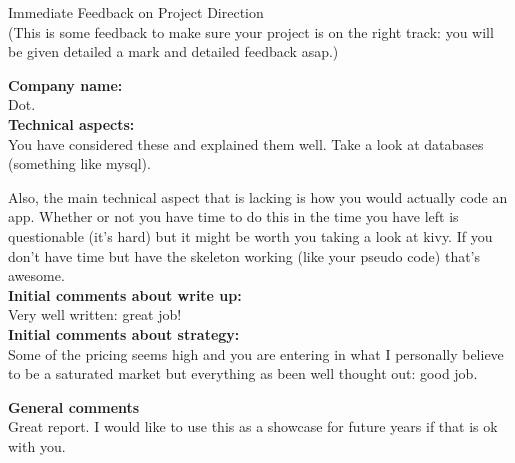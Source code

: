\documentclass{article}
\begin{document}
\begin{center}
\Huge{Immediate Feedback on Project Direction}\\
\tiny{(This is some feedback to make sure your project is on the right track: you will be given detailed a mark and detailed feedback asap.)}
\end{center}


\normalsize
\textbf{Company name:}\\

Dot. \\

\textbf{Technical aspects:}\\

You have considered these and explained them well.
Take a look at databases (something like mysql).

Also, the main technical aspect that is lacking is how you would actually code an app.
Whether or not you have time to do this in the time you have left is questionable (it's hard) but it might be worth you taking a look at kivy.
If you don't have time but have the skeleton working (like your pseudo code) that's awesome.\\

\textbf{Initial comments about write up:}\\

Very well written: great job!\\

\textbf{Initial comments about strategy:}\\

Some of the pricing seems high and you are entering in what I personally believe to be a saturated market but everything as been well thought out: good job.

\textbf{General comments}\\

Great report. I would like to use this as a showcase for future years if that is ok with you.
\end{document}
